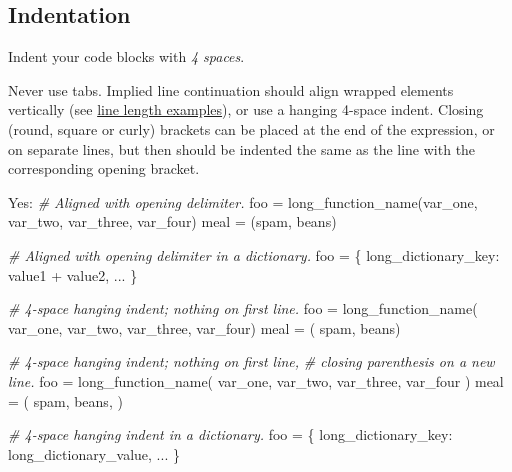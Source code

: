 \documentclass[
]{article}
\newenvironment{Shaded}{}{}
\newcommand{\CommentTok}[1]{\textcolor[rgb]{0.38,0.63,0.69}{\textit{#1}}}
\newcommand{\NormalTok}[1]{#1}
\newcommand{\OperatorTok}[1]{\textcolor[rgb]{0.40,0.40,0.40}{#1}}
\newcommand{\StringTok}[1]{\textcolor[rgb]{0.25,0.44,0.63}{#1}}
\begin{document}
\subsection{Indentation}

Indent your code blocks with \emph{4 spaces}.

Never use tabs. Implied line continuation should align wrapped elements
vertically (see \hyperref[s3.2-line-length]{line length examples}), or
use a hanging 4-space indent. Closing (round, square or curly) brackets
can be placed at the end of the expression, or on separate lines, but
then should be indented the same as the line with the corresponding
opening bracket.

\begin{samepage}
\begin{Shaded}
\begin{Highlighting}[]
\NormalTok{Yes:   }\CommentTok{\# Aligned with opening delimiter.}
\NormalTok{       foo }\OperatorTok{=}\NormalTok{ long\_function\_name(var\_one, var\_two,}
\NormalTok{                                var\_three, var\_four)}
\NormalTok{       meal }\OperatorTok{=}\NormalTok{ (spam,}
\NormalTok{               beans)}

       \CommentTok{\# Aligned with opening delimiter in a dictionary.}
\NormalTok{       foo }\OperatorTok{=}\NormalTok{ \{}
           \StringTok{\textquotesingle{}long\_dictionary\_key\textquotesingle{}}\NormalTok{: value1 }\OperatorTok{+}
\NormalTok{                                  value2,}
\NormalTok{           ...}
\NormalTok{       \}}

       \CommentTok{\# 4{-}space hanging indent; nothing on first line.}
\NormalTok{       foo }\OperatorTok{=}\NormalTok{ long\_function\_name(}
\NormalTok{           var\_one, var\_two, var\_three,}
\NormalTok{           var\_four)}
\NormalTok{       meal }\OperatorTok{=}\NormalTok{ (}
\NormalTok{           spam,}
\NormalTok{           beans)}

       \CommentTok{\# 4{-}space hanging indent; nothing on first line,}
       \CommentTok{\# closing parenthesis on a new line.}
\NormalTok{       foo }\OperatorTok{=}\NormalTok{ long\_function\_name(}
\NormalTok{           var\_one, var\_two, var\_three,}
\NormalTok{           var\_four}
\NormalTok{       )}
\NormalTok{       meal }\OperatorTok{=}\NormalTok{ (}
\NormalTok{           spam,}
\NormalTok{           beans,}
\NormalTok{       )}

       \CommentTok{\# 4{-}space hanging indent in a dictionary.}
\NormalTok{       foo }\OperatorTok{=}\NormalTok{ \{}
           \StringTok{\textquotesingle{}long\_dictionary\_key\textquotesingle{}}\NormalTok{:}
\NormalTok{               long\_dictionary\_value,}
\NormalTok{           ...}
\NormalTok{       \}}
\end{Highlighting}
\end{Shaded}
\end{samepage}
\end{document}
